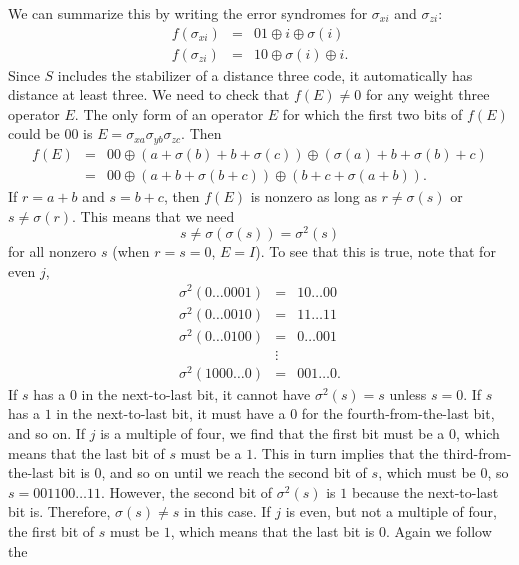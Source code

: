 \documentclass{report}
\newcommand{\Xs}[1]{\sigma_{x{#1}}}
\newcommand{\Ys}[1]{\sigma_{y{#1}}}
\newcommand{\Zs}[1]{\sigma_{z{#1}}}
\begin{document}
We can summarize this by writing the error syndromes for $\Xs{i}$ and 
$\Zs{i}$:
\begin{eqnarray}
f (\Xs{i}) & = & 01 \oplus i \oplus \sigma (i) \\
f (\Zs{i}) & = & 10 \oplus \sigma (i) \oplus i.
\end{eqnarray}
Since $S$ includes the stabilizer of a distance three code, it automatically 
has distance at least three.  We need to check that $f(E) \neq 0$ for any 
weight three operator $E$.  The only form of an operator $E$ for which the 
first two bits of $f(E)$ could be $00$ is $E = \Xs{a} \Ys{b} \Zs{c}$.  Then
\begin{eqnarray}
f (E) & = & 00 \oplus (a + \sigma (b) + b + \sigma (c) ) \oplus (\sigma (a) + 
b + \sigma (b) + c) \\
& = & 00 \oplus (a+b + \sigma (b+c) ) \oplus (b+c + \sigma (a+b) ).
\end{eqnarray}
If $r = a+b$ and $s = b+c$, then $f(E)$ is nonzero as long as $r \neq 
\sigma (s)$ or $s \neq \sigma (r)$.  This means that we need
\begin{equation}
s \neq \sigma (\sigma (s)) = \sigma^2 (s)
\end{equation}
for all nonzero $s$ (when $r=s=0$, $E=I$).  To see that this is true, note 
that for even $j$,
\begin{eqnarray}
\sigma^2 (0 \ldots 0 0 0 1) & = & 1 0 \ldots 0 0  \nonumber \\
\sigma^2 (0 \ldots 0 0 1 0) & = & 1 1 \ldots 1 1 \nonumber \\
\sigma^2 (0 \ldots 0 1 0 0) & = & 0 \ldots 0 0 1 \\
& \vdots & \nonumber \\
\sigma^2 (1 0 0 0 \ldots 0) & = & 0 0 1 \ldots 0. \nonumber
\end{eqnarray}
If $s$ has a $0$ in the next-to-last bit, it cannot have $\sigma^2 (s) = s$ 
unless $s=0$.  If $s$ has a $1$ in the next-to-last bit, it must have a $0$ for 
the fourth-from-the-last bit, and so on.  If $j$ is a multiple of four, we find 
that the first bit must be a $0$, which means that the last bit of $s$ must be 
a $1$.  This in turn implies that the third-from-the-last bit is $0$, and so on 
until we reach the second bit of $s$, which must be $0$, so $s = 0 0 1 1 0 0 
\ldots 1 1$.  However, the second bit of $\sigma^2 (s)$ is $1$ because the 
next-to-last bit is.  Therefore, $\sigma(s) \neq s$ in this case.  
If $j$ is even, but not a multiple of four, the first bit 
of $s$ must be $1$, which means that the last bit is $0$.  Again we follow the 
\end{document}
